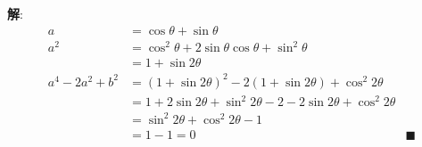 \documentclass{report}
\newcommand{\sol}{\vspace{0.2cm}\textbf{解}:}
\begin{document}
\begin{enumerate}[leftmargin=*]
        \sol{}
        \begin{align*}
            a &= \cos \theta + \sin \theta\\
            a^2 &= \cos^2\theta + 2\sin\theta\cos\theta + \sin^2\theta\\
            &= 1 + \sin 2\theta\\
            a^4 - 2a^2 + b^2 &= (1 + \sin 2\theta)^2 - 2(1 + \sin 2\theta) + \cos^2 2\theta\\
            &= 1 + 2\sin 2\theta + \sin^2 2\theta - 2 - 2\sin 2\theta + \cos^2 2\theta\\
            &= \sin^2 2\theta + \cos^2 2\theta - 1\\
            & = 1 - 1 = 0 & \blacksquare
        \end{align*}

    \end{enumerate}
\end{document}

